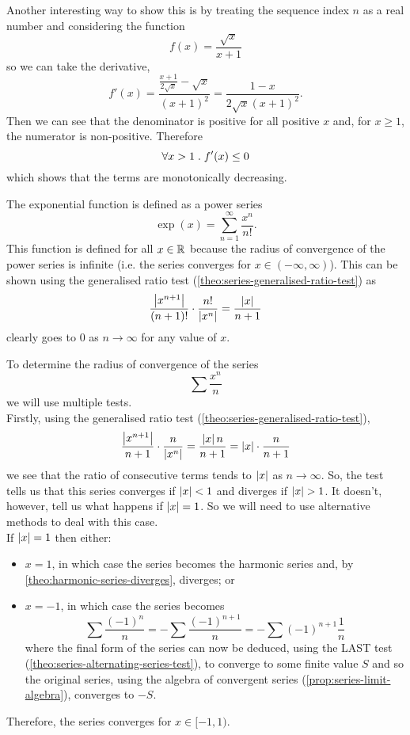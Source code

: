 \documentclass[../MathsNotesBase.tex]{subfiles}
\begin{document}
{\begin{exe}
			Another interesting way to show this is by treating the sequence index $n$ as a real number and considering the function
			\[ f(x) = \frac{\sqrt{x}}{x + 1} \]
			so we can take the derivative,
			\[ f'(x) = \frac{\frac{x+1}{2\sqrt{x}} - \sqrt{x}}{(x + 1)^2} = \frac{1 - x}{2\sqrt{x}(x + 1)^2}. \]
			Then we can see that the denominator is positive for all positive $x$ and, for ${ x \geq 1 }$, the numerator is non-positive. Therefore
			\[ \forall x > 1 \;.\; f'(x) \leq 0 \]
			which shows that the terms are monotonically decreasing.
			
			\biggerskip
			\ex The exponential function is defined as a power series
			\[ \exp(x) = \sum_{n=1}^\infty \frac{x^n}{n!}. \]
			This function is defined for all ${ x \in \mathbb{R}^{} }$ because the radius of convergence of the power series is infinite (i.e. the series converges for ${ x \in (-\infty, \infty) }$). This can be shown using the generalised ratio test (\autoref{theo:series-generalised-ratio-test}) as
			\[ \frac{ \left\lvert x^{n+1}\right\rvert }{ (n+1)! } \cdot \frac{ n! }{ \left\lvert x^n\right\rvert } = \frac{\left\lvert x\right\rvert}{n + 1} \]
			clearly goes to 0 as ${ n \to \infty }$ for any value of $x$.
			
			\biggerskip
			\ex To determine the radius of convergence of the series
			\[ \sum \frac{x^n}{n} \]
			we will use multiple tests.\\
			
			Firstly, using the generalised ratio test (\autoref{theo:series-generalised-ratio-test}),
			\[ \frac{ \left\lvert x^{n+1}\right\rvert }{ n + 1 } \cdot \frac{ n }{ \left\lvert x^n\right\rvert } = \frac{\left\lvert x\right\rvert n}{n+1} = \left\lvert x\right\rvert \cdot \frac{n}{n+1} \]
			we see that the ratio of consecutive terms tends to $\left\lvert x\right\rvert$ as ${ n \to \infty }$. So, the test tells us that this series converges if ${ \left\lvert x\right\rvert < 1 }$ and diverges if ${ \left\lvert x\right\rvert > 1 }$. It doesn't, however, tell us what happens if ${ \left\lvert x\right\rvert = 1 }$. So we will need to use alternative methods to deal with this case.\\
			
			If ${ \left\lvert x\right\rvert = 1 }$ then either:
			\begin{itemize}
				\item ${ x = 1 }$, in which case the series becomes the harmonic series and, by \autoref{theo:harmonic-series-diverges}, diverges; or
				\item ${ x = -1 }$, in which case the series becomes
				\[ \sum \frac{ (-1)^n }{ n } = - \sum \frac{ (-1)^{n+1} }{ n } = - \sum (-1)^{n+1} \frac{1}{n} \]
				where the final form of the series can now be deduced, using the LAST test (\autoref{theo:series-alternating-series-test}), to converge to some finite value $S$ and so the original series, using the algebra of convergent series (\autoref{prop:series-limit-algebra}), converges to $-S$.
			\end{itemize}
		
			\nl[2]
			Therefore, the series converges for ${ x \in [-1, 1) }$.
		\end{exe}
	}
\end{document}

